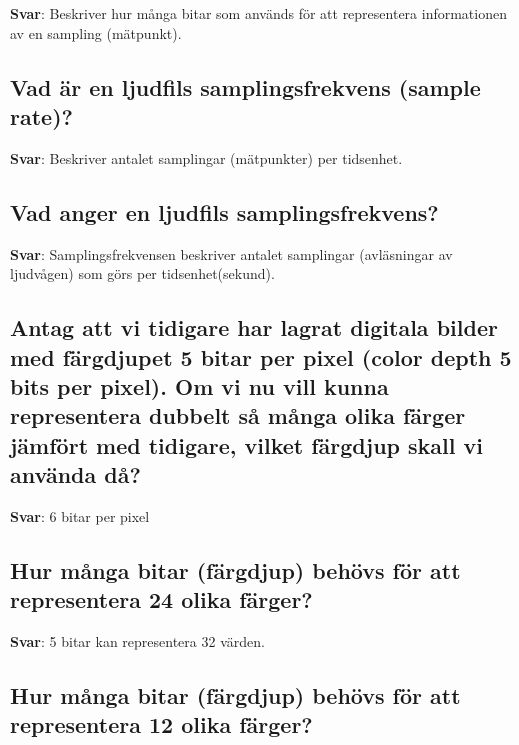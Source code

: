 \documentclass[a4paper,11pt,oneside]{article}
\begin{document}
\begin{sloppypar}
\label{q:81:sa:sv:True}

\textbf{Svar}: Beskriver hur m\r{a}nga bitar som anv\"ands f\"or att representera informationen av en sampling (m\"atpunkt).



\subsection{Vad \"ar en ljudfils samplingsfrekvens (sample rate)?}

\label{q:82:sa:sv:True}

\textbf{Svar}: Beskriver antalet samplingar (m\"atpunkter) per tidsenhet.



\subsection{Vad anger en ljudfils samplingsfrekvens?}

\label{q:83:sa:sv:True}

\textbf{Svar}: Samplingsfrekvensen beskriver antalet samplingar (avl\"asningar av ljudv\r{a}gen) som g\"ors per tidsenhet(sekund).



\subsection{Antag att vi tidigare har lagrat digitala bilder med f\"argdjupet 5 bitar per pixel (color depth 5 bits per pixel). Om vi nu vill kunna representera dubbelt s\r{a} m\r{a}nga olika f\"arger j\"amf\"ort med tidigare, vilket f\"argdjup skall vi anv\"anda d\r{a}?}

\label{q:84:sa:sv:True}

\textbf{Svar}: 6 bitar per pixel



\subsection{Hur m\r{a}nga bitar (f\"argdjup) beh\"ovs f\"or att representera 24 olika f\"arger?}

\label{q:85:sa:sv:True}

\textbf{Svar}: 5 bitar kan representera 32 v\"arden.



\subsection{Hur m\r{a}nga bitar (f\"argdjup) beh\"ovs f\"or att representera 12 olika f\"arger?}


\end{sloppypar}
\end{document}
